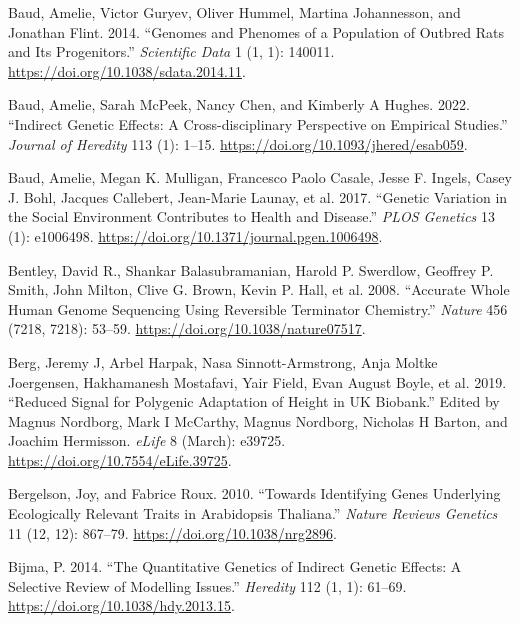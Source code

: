 \documentclass[
]{book}
\newlength{\cslhangindent}
\newlength{\cslentryspacingunit} %
\newenvironment{CSLReferences}[2] %
 {%
  \setlength{\parindent}{0pt}
  \ifodd #1
  \let\oldpar\par
  \def\par{\hangindent=\cslhangindent\oldpar}
  \fi
  \setlength{\parskip}{#2\cslentryspacingunit}
 }%
 {}
\begin{document}
\begin{CSLReferences}{1}{0}
\leavevmode{}%
Baud, Amelie, Victor Guryev, Oliver Hummel, Martina Johannesson, and Jonathan Flint. 2014. {``Genomes and Phenomes of a Population of Outbred Rats and Its Progenitors.''} \emph{Scientific Data} 1 (1, 1): 140011. \url{https://doi.org/10.1038/sdata.2014.11}.

\leavevmode{}%
Baud, Amelie, Sarah McPeek, Nancy Chen, and Kimberly A Hughes. 2022. {``Indirect {Genetic Effects}: {A Cross-disciplinary Perspective} on {Empirical Studies}.''} \emph{Journal of Heredity} 113 (1): 1--15. \url{https://doi.org/10.1093/jhered/esab059}.

\leavevmode{}%
Baud, Amelie, Megan K. Mulligan, Francesco Paolo Casale, Jesse F. Ingels, Casey J. Bohl, Jacques Callebert, Jean-Marie Launay, et al. 2017. {``Genetic {Variation} in the {Social Environment Contributes} to {Health} and {Disease}.''} \emph{PLOS Genetics} 13 (1): e1006498. \url{https://doi.org/10.1371/journal.pgen.1006498}.

\leavevmode{}%
Bentley, David R., Shankar Balasubramanian, Harold P. Swerdlow, Geoffrey P. Smith, John Milton, Clive G. Brown, Kevin P. Hall, et al. 2008. {``Accurate Whole Human Genome Sequencing Using Reversible Terminator Chemistry.''} \emph{Nature} 456 (7218, 7218): 53--59. \url{https://doi.org/10.1038/nature07517}.

\leavevmode{}%
Berg, Jeremy J, Arbel Harpak, Nasa Sinnott-Armstrong, Anja Moltke Joergensen, Hakhamanesh Mostafavi, Yair Field, Evan August Boyle, et al. 2019. {``Reduced Signal for Polygenic Adaptation of Height in {UK Biobank}.''} Edited by Magnus Nordborg, Mark I McCarthy, Magnus Nordborg, Nicholas H Barton, and Joachim Hermisson. \emph{eLife} 8 (March): e39725. \url{https://doi.org/10.7554/eLife.39725}.

\leavevmode{}%
Bergelson, Joy, and Fabrice Roux. 2010. {``Towards Identifying Genes Underlying Ecologically Relevant Traits in {Arabidopsis} Thaliana.''} \emph{Nature Reviews Genetics} 11 (12, 12): 867--79. \url{https://doi.org/10.1038/nrg2896}.

\leavevmode{}%
Bijma, P. 2014. {``The Quantitative Genetics of Indirect Genetic Effects: A Selective Review of Modelling Issues.''} \emph{Heredity} 112 (1, 1): 61--69. \url{https://doi.org/10.1038/hdy.2013.15}.


\end{CSLReferences}
\end{document}

